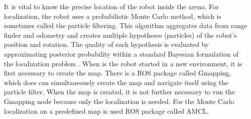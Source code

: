 It is vital to know the precise location of the robot inside the arena. For localization, the robot uses a probabilistic Monte Carlo method, which is sometimes called the particle filtering. This algorithm aggregates data from range finder and odometry and creates multiple hypotheses (particles) of the robot's position and rotation. The quality of each hypothesis is evaluated by approximating posterior probability within a standard Bayesian formulation of the localization problem \cite{dellaert1999} \cite{thrun2000}. When is the robot started in a new environment, it is first necessary to create the map. There is a ROS package called Gmapping, which does can simultaneously create the map and navigate itself using the particle filter. When the map is created, it is not further necessary to run the Gmapping node because only the localization is needed. For the Monte Carlo localization on a predefined map is used ROS package called AMCL.

\newpage